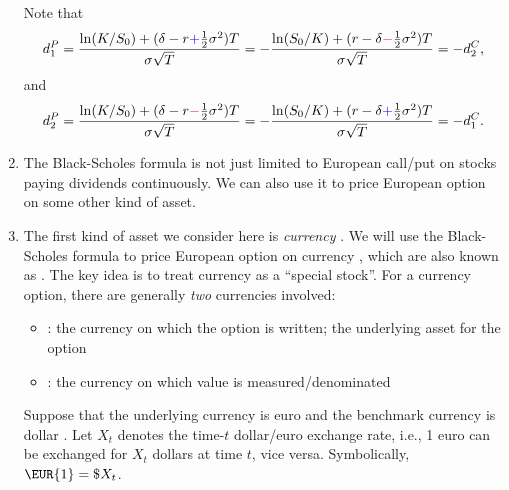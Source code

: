 \begin{enumerate}
\begin{pf}
Note that
\[
d_1^{P}=\frac{\ln(K/S_0)+(\delta-r{\color{blue}+}\frac{1}{2}\sigma^2)T}{\sigma\sqrt{T}}
=-\frac{\ln(S_0/K)+(r-\delta{\color{red}-}\frac{1}{2}\sigma^2)T}{\sigma\sqrt{T}}
=-d_2^C,
\]
and
\[
d_2^{P}=\frac{\ln(K/S_0)+(\delta-r{\color{red}-}\frac{1}{2}\sigma^2)T}{\sigma\sqrt{T}}
=-\frac{\ln(S_0/K)+(r-\delta{\color{blue}+}\frac{1}{2}\sigma^2)T}{\sigma\sqrt{T}}
=-d_1^C.
\]
\end{pf}
\item The Black-Scholes formula is not just limited to European call/put on
stocks paying dividends continuously. We can also use it to price European
option on some other kind of asset.

\item The first kind of asset we consider here is \emph{currency}
. We will use the Black-Scholes formula to price European
option on currency , which are also known as .  The key idea is to treat currency as a ``special stock''. For a
currency option, there are generally \emph{two} currencies involved:
\begin{itemize}
\item {}: the currency on which the
option is written; the underlying asset for the option
\item {}: the currency on which value is
measured/denominated
\end{itemize}
Suppose that the underlying currency is euro  and the
benchmark currency is dollar . Let \(X_t\) denotes the
time-\(t\) dollar/euro exchange rate, i.e., 1 euro can be exchanged for \(X_t\)
dollars at time \(t\), vice versa. Symbolically, \(\EUR{1}=\$ X_t\).


\end{enumerate}
